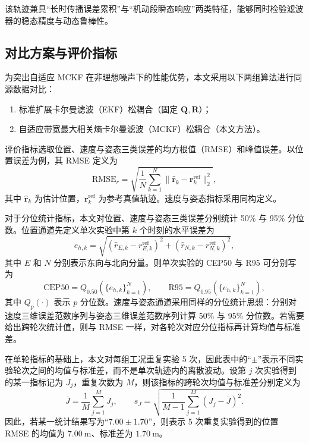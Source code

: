 该轨迹兼具“长时传播误差累积”与“机动段瞬态响应”两类特征，能够同时检验滤波器的稳态精度与动态鲁棒性。

\subsection{对比方案与评价指标}

为突出自适应 MCKF 在非理想噪声下的性能优势，本文采用以下两组算法进行同源数据对比\cite{izanloo2016kalman,xie2025adaptive}：
\begin{enumerate}
\item 标准扩展卡尔曼滤波（EKF）松耦合（固定 $\bm{Q},\bm{R}$）；
\item 自适应带宽最大相关熵卡尔曼滤波（MCKF）松耦合（本文方法）。
\end{enumerate}


评价指标选取位置、速度与姿态三类误差的均方根值（RMSE）和峰值误差。以位置误差为例，其 RMSE 定义为
\begin{equation}
\mathrm{RMSE}_{r}=\sqrt{\frac{1}{N}\sum_{k=1}^{N}\|\hat{\bm{r}}_k-\bm{r}_k^{\text{ref}}\|_2^2},
\label{eq:ch4_rmse_pos}
\end{equation}
其中 $\hat{\bm{r}}_k$ 为估计位置，$\bm{r}_k^{\text{ref}}$ 为参考真值轨迹。速度与姿态指标采用同构定义。

对于分位统计指标，本文对位置、速度与姿态三类误差分别统计 50\% 与 95\% 分位数。位置通道先定义单次实验中第 $k$ 个时刻的水平误差为
\begin{equation}
e_{h,k}=\sqrt{\left(\hat r_{E,k}-r^{\text{ref}}_{E,k}\right)^2+\left(\hat r_{N,k}-r^{\text{ref}}_{N,k}\right)^2},
\label{eq:ch4_horizontal_error}
\end{equation}
其中 $E$ 和 $N$ 分别表示东向与北向分量。则单次实验的 CEP50 与 R95 可分别写为
\begin{equation}
\mathrm{CEP50}=Q_{0.50}\!\left(\{e_{h,k}\}_{k=1}^{N}\right),
\qquad
\mathrm{R95}=Q_{0.95}\!\left(\{e_{h,k}\}_{k=1}^{N}\right),
\label{eq:ch4_cep_r95}
\end{equation}
其中 $Q_{p}(\cdot)$ 表示 $p$ 分位数。速度与姿态通道采用同样的分位统计思想：分别对速度三维误差范数序列与姿态三维误差范数序列计算 50\% 与 95\% 分位数。若需要给出跨轮次统计值，则与 RMSE 一样，对各轮次对应分位指标再计算均值与标准差。

在单轮指标的基础上，本文对每组工况重复实验 5 次，因此表中的“$\pm$”表示不同实验轮次之间的均值与标准差，而不是单次轨迹内的离散波动。设第 $j$ 次实验得到的某一指标记为 $J_j$，重复次数为 $M$，则该指标的跨轮次均值与标准差分别定义为
\begin{equation}
\bar{J}=\frac{1}{M}\sum_{j=1}^{M}J_j,
\qquad
s_J=\sqrt{\frac{1}{M-1}\sum_{j=1}^{M}\left(J_j-\bar{J}\right)^2}.
\label{eq:ch4_mean_std}
\end{equation}
因此，若某一统计结果写为“$7.00\pm1.70$”，则表示 5 次重复实验得到的位置 RMSE 的均值为 $7.00~\mathrm{m}$、标准差为 $1.70~\mathrm{m}$。

